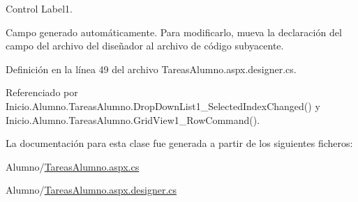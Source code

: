 Control Label1. 

Campo generado automáticamente. Para modificarlo, mueva la declaración del campo del archivo del diseñador al archivo de código subyacente. 

Definición en la línea 49 del archivo Tareas\+Alumno.\+aspx.\+designer.\+cs.



Referenciado por Inicio.\+Alumno.\+Tareas\+Alumno.\+Drop\+Down\+List1\+\_\+\+Selected\+Index\+Changed() y Inicio.\+Alumno.\+Tareas\+Alumno.\+Grid\+View1\+\_\+\+Row\+Command().



La documentación para esta clase fue generada a partir de los siguientes ficheros\+:\begin{DoxyCompactItemize}
\item 
Alumno/\mbox{\hyperlink{TareasAlumno_8aspx_8cs}{Tareas\+Alumno.\+aspx.\+cs}}\item 
Alumno/\mbox{\hyperlink{TareasAlumno_8aspx_8designer_8cs}{Tareas\+Alumno.\+aspx.\+designer.\+cs}}\end{DoxyCompactItemize}
